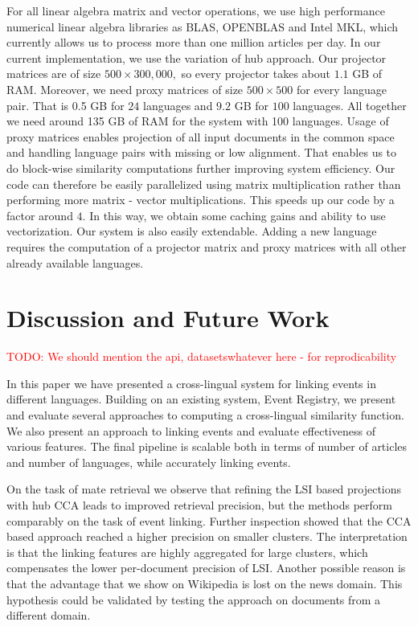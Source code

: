 \documentclass[twoside,11pt]{article}
\newcommand{\todo}[1]{\textcolor{red}{TODO: #1}}
\begin{document}
For all linear algebra matrix and vector operations, we use high performance numerical linear algebra libraries as BLAS, OPENBLAS and Intel MKL, which currently allows us to process more than one million articles per day.
In our current implementation, we use the variation of hub approach. Our projector matrices are of size $500\times 300,000,$ so every projector takes about $1.1$ GB of RAM. Moreover, we need proxy matrices of size $500\times500$ for every language pair. That is 0.5 GB for $24$ languages and $9.2$ GB for $100$ languages. All together we need around 135 GB of RAM for the system with 100 languages.
 Usage of proxy matrices enables projection of all input documents in the common space and handling language pairs with missing or low alignment. That enables us to do block-wise similarity computations further improving system efficiency. Our code can therefore be easily parallelized using matrix multiplication rather than performing more matrix - vector multiplications. This speeds up our code by a factor around $4.$ In this way, we obtain some caching gains and ability to use vectorization.
Our system is also easily extendable. Adding a new language requires the  computation of  a projector matrix and proxy matrices with all other already available languages.

\section{Discussion and Future Work}
\todo{We should mention the api, datasetswhatever here - for reprodicability}

In this paper we have presented a cross-lingual system for linking events in different languages. Building on an existing system, Event Registry, we present and evaluate several approaches to computing a  cross-lingual similarity function. We also present an approach to linking events and evaluate effectiveness of various features.  The  final pipeline is scalable both in terms of number of articles and number of languages, while accurately linking events.

On the task of mate retrieval we observe that refining the LSI based projections with hub CCA leads to improved retrieval precision, but the methods perform comparably on the task of event linking. Further inspection showed that the CCA based approach reached a higher precision on smaller clusters. The interpretation is that the linking features are highly aggregated for large clusters, which compensates the lower per-document precision of LSI. Another possible reason is that the advantage that we show on Wikipedia is lost on the news domain. This hypothesis could be validated by testing the approach on documents from a different domain.
\end{document}

